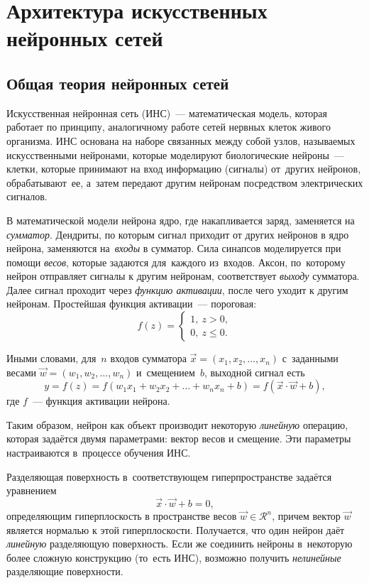 \chapter{Архитектура искусственных нейронных сетей}

\section{Общая теория нейронных сетей}
Искусственная нейронная сеть (ИНС)~--- математическая модель, 
которая работает по принципу, аналогичному работе сетей нервных клеток живого организма.
ИНС основана на наборе связанных между собой узлов, 
называемых искусственными нейронами, которые моделируют биологические нейроны~--- клетки,
которые принимают на вход информацию (сигналы) от~других нейронов, обрабатывают~ее, а~затем передают 
другим нейронам посредством электрических сигналов.

В математической модели нейрона ядро, где накапливается заряд, заменяется на \textit{сумматор}. 
Дендриты, по которым сигнал приходит от других нейронов в ядро нейрона, заменяются на~\textit{входы} в сумматор.
Сила синапсов моделируется при помощи \textit{весов}, которые задаются для~каждого из~входов.
Аксон, по~которому нейрон отправляет сигналы к другим нейронам, соответствует \textit{выходу} сумматора.
Далее сигнал проходит через \textit{функцию активации}, после чего уходит 
к другим нейронам. Простейшая функция активации~--- пороговая:
\begin{equation*}\label{key}
f(z) = \begin{cases}
1,~z>0,\\
0,~z\leq 0.
\end{cases}
\end{equation*}

Иными словами, для~$ n $ входов сумматора $ \vec{x} = (x_1, x_2,\ldots, x_n) $ с~заданными весами $ \vec{w} = (w_1, w_2,\ldots, w_n) $ и~смещением~$ b $, выходной сигнал есть
\begin{equation*}
y = f(z) = f(w_1 x_1 + w_2 x_2 + \ldots + w_n x_n + b) = f(\vec{x}\cdot\vec{w} + b),
\end{equation*}
где $f$~--- функция активации нейрона.

Таким образом, нейрон как объект производит некоторую \textit{линейную} операцию, которая задаётся двумя параметрами: 
вектор весов и смещение. Эти параметры настраиваются в~процессе обучения ИНС.

Разделяющая поверхность в~соответствующем гиперпространстве
задаётся уравнением $$ \vec{x}\cdot\vec{w} + b = 0, $$ 
определяющим гиперплоскость в пространстве весов $ \vec{w}\in\mathcal{R}^n $, причем вектор 
$ \vec{w} $ является нормалью к этой гиперплоскости. Получается, что один 
нейрон даёт \textit{линейную} разделяющую поверхность. 
Если же соединить нейроны в~некоторую более сложную конструкцию (то~есть ИНС), 
возможно получить \textit{нелинейные} разделяющие поверхности.


